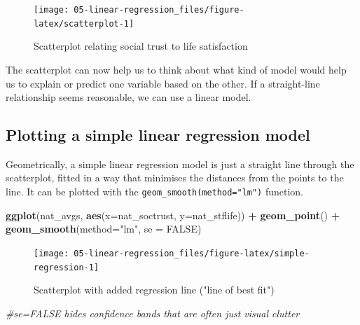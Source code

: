 \documentclass[
]{book}
\newenvironment{Shaded}{\begin{snugshade}}{\end{snugshade}}
\newcommand{\CommentTok}[1]{\textcolor[rgb]{0.56,0.35,0.01}{\textit{#1}}}
\newcommand{\DataTypeTok}[1]{\textcolor[rgb]{0.13,0.29,0.53}{#1}}
\newcommand{\KeywordTok}[1]{\textcolor[rgb]{0.13,0.29,0.53}{\textbf{#1}}}
\newcommand{\NormalTok}[1]{#1}
\newcommand{\OperatorTok}[1]{\textcolor[rgb]{0.81,0.36,0.00}{\textbf{#1}}}
\newcommand{\OtherTok}[1]{\textcolor[rgb]{0.56,0.35,0.01}{#1}}
\newcommand{\StringTok}[1]{\textcolor[rgb]{0.31,0.60,0.02}{#1}}
\begin{document}
\begin{figure}

{\centering \texttt{[image: 05-linear-regression\_files/figure-latex/scatterplot-1]} 

}

\caption{Scatterplot relating social trust to life satisfaction}\label{fig:scatterplot}
\end{figure}

The scatterplot can now help us to think about what kind of model would
help us to explain or predict one variable based on the other. If a
straight-line relationship seems reasonable, we can use a linear model.

\hypertarget{plotting-a-simple-linear-regression-model}{%
\subsection{Plotting a simple linear regression model}\label{plotting-a-simple-linear-regression-model}}

Geometrically, a simple linear regression model is just a straight line
through the scatterplot, fitted in a way that minimises the distances
from the points to the line. It can be plotted with the
\texttt{geom\_smooth(method="lm")} function.

\begin{Shaded}
\begin{Highlighting}[]
\KeywordTok{ggplot}\NormalTok{(nat_avgs, }\KeywordTok{aes}\NormalTok{(}\DataTypeTok{x=}\NormalTok{nat_soctrust, }\DataTypeTok{y=}\NormalTok{nat_stflife)) }\OperatorTok{+}\StringTok{ }
\StringTok{  }\KeywordTok{geom_point}\NormalTok{() }\OperatorTok{+}\StringTok{ }\KeywordTok{geom_smooth}\NormalTok{(}\DataTypeTok{method=}\StringTok{"lm"}\NormalTok{, }\DataTypeTok{se =} \OtherTok{FALSE}\NormalTok{) }
\end{Highlighting}
\end{Shaded}

\begin{figure}

{\centering \texttt{[image: 05-linear-regression\_files/figure-latex/simple-regression-1]} 

}

\caption{Scatterplot with added regression line ("line of best fit")}\label{fig:simple-regression}
\end{figure}

\begin{Shaded}
\begin{Highlighting}[]
  \CommentTok{#se=FALSE hides confidence bands that are often just visual clutter}
\end{Highlighting}
\end{Shaded}
\end{document}
